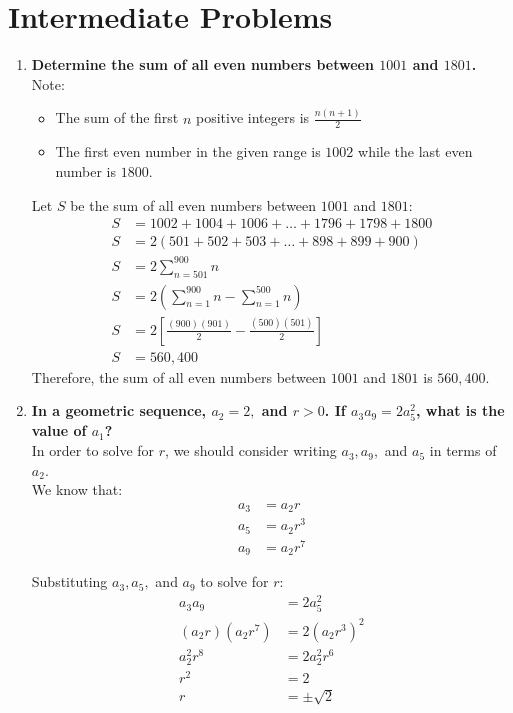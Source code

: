 \documentclass[12pt]{article}
\begin{document}
\section*{Intermediate Problems}
\begin{enumerate}
    \item \textbf{Determine the sum of all even numbers between $1001$ and $1801$.} \\
    
    Note: 
    \begin{itemize}
        \item The sum of the first $n$ positive integers is $\frac{n(n+1)}{2}$
        \item The first even number in the given range is $1002$ while the last even number is $1800$.
    \end{itemize}
    Let $S$ be the sum of all even numbers between $1001$ and $1801$:
    \begin{align*}
        S & = 1002 + 1004 + 1006 + \dots + 1796 + 1798 + 1800 \\
        S & = 2(501 + 502 + 503 + \dots + 898 + 899 + 900) \\
        S & = 2\sum_{n = 501}^{900} n \\
        S & = 2(\sum_{n = 1}^{900} n - \sum_{n = 1}^{500}n) \\
        S & = 2[\frac{(900)(901)}{2} - \frac{(500)(501)}{2}] \\
        S & = 560,400
    \end{align*}
    Therefore, the sum of all even numbers between $1001$ and $1801$ is $560,400$.
    
    \newpage
    
    \item \textbf{In a geometric sequence, $a_2 = 2,$ and $r > 0$. If $a_3a_9 = 2a^2_5$, what is the value of $a_1$?} \\
    
    In order to solve for $r$, we should consider writing $a_3, a_9,$ and $a_5$ in terms of $a_2$. \\
    
    We know that:
    \begin{align*}
        a_3 & = a_2r \\
        a_5 & = a_2r^3 \\
        a_9 & = a_2r^7
    \end{align*}
    
    Substituting $a_3, a_5,$ and $a_9$ to solve for $r$:
    \begin{align*}
        a_3a_9 & = 2a_5^2 \\
        (a_2r)(a_2r^7) & = 2(a_2r^3)^2 \\
        a_2^2r^8 & = 2a_2^2r^6 \\
        r^2 & = 2 \\
        r & = \pm \sqrt{2}
    \end{align*}
    

\end{enumerate}
\end{document}
